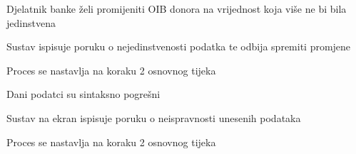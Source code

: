 \begin{packed_item}
\begin{packed_item}
							\item[4.a] Djelatnik banke želi promijeniti OIB donora na vrijednost koja više ne bi bila jedinstvena
							\begin{packed_enum}
								\item Sustav ispisuje poruku o nejedinstvenosti podatka te odbija spremiti promjene
								\item Proces se nastavlja na koraku 2 osnovnog tijeka
							\end{packed_enum}
							
							\item[4.b] Dani podatci su sintaksno pogrešni
							\begin{packed_enum}
								\item Sustav na ekran ispisuje poruku o neispravnosti unesenih podataka
								\item Proces se nastavlja na koraku 2 osnovnog tijeka
							\end{packed_enum}
							
						\end{packed_item}
						
					\end{packed_item}
					
